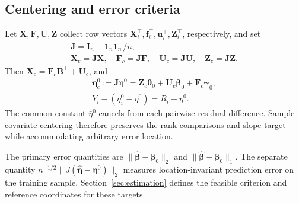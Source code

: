 \subsection{Centering and error criteria}
\label{subsec:centering}
Let $\bm{X},\bm{F},\bm{U},\bm{Z}$ collect row vectors $\bm{X}_i^\top,\bm{f}_i^\top,\bm{u}_i^\top,\bm{Z}_i^\top$, respectively, and set
\begin{equation}
 \begin{gathered}
\bm{J}=\bm{I}_n-\mathbf 1_n\mathbf 1_n^\top/n,\\
 \bm{X}_c=\bm{J}\bm{X},\quad \bm{F}_c=\bm{J}\bm{F},\quad \bm{U}_c=\bm{J}\bm{U},\quad \bm{Z}_c=\bm{J}\bm{Z}.
 \end{gathered}
 \label{eq:sample-centering}
\end{equation}
Then $\bm{X}_c=\bm{F}_c\bm{B}^\top+\bm{U}_c$, and
\begin{equation}
 \begin{gathered}
\bm{\eta}_c^0:=\bm{J}\bm{\eta}^0
   =\bm{Z}_c\bm{\theta}_0+\bm{U}_c\bm{\beta}_0+\bm{F}_c\bm{\gamma}_0,
 \\
 Y_i-(\eta_i^0-\bar\eta^0)=R_i+\bar\eta^0.
 \end{gathered}
 \label{eq:centered-predictor}
\end{equation}
The common constant $\bar\eta^0$ cancels from each pairwise residual difference. Sample covariate centering therefore preserves the rank comparisons and slope target while accommodating arbitrary error location.

The primary error quantities are $\|\widehat{\bm{\beta}}-\bm{\beta}_0\|_2$ and $\|\widehat{\bm{\beta}}-\bm{\beta}_0\|_1$. The separate quantity $n^{-1/2}\|J(\widehat{\bm{\eta}}-\bm{\eta}^0)\|_2$ measures location-invariant prediction error on the training sample. Section~\ref{sec:estimation} defines the feasible criterion and reference coordinates for these targets.
